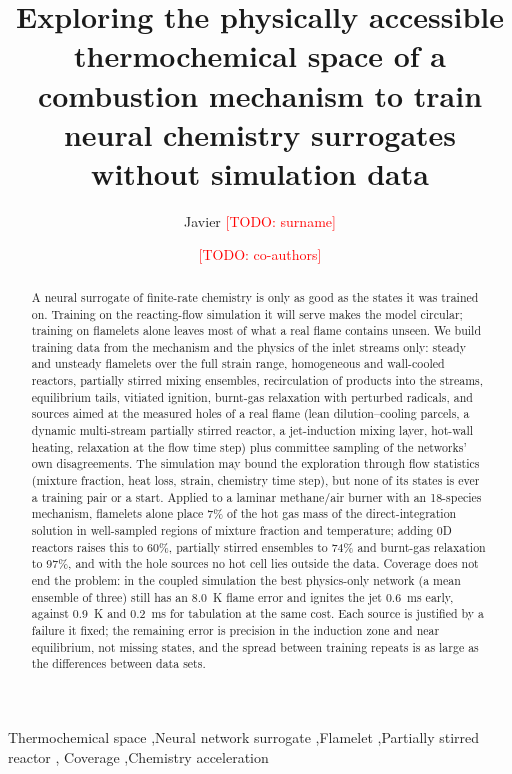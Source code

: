 \documentclass[preprint,review,12pt]{elsarticle}
\newcommand{\todo}[1]{\textcolor{red}{[TODO: #1]}}
\begin{document}
\begin{frontmatter}

\title{Exploring the physically accessible thermochemical space of a combustion mechanism to train neural
chemistry surrogates without simulation data}

\author[a]{Javier \todo{surname}}
\author[a]{\todo{co-authors}}
\address[a]{\todo{affiliation}}

\begin{abstract}
A neural surrogate of finite-rate chemistry is only as good as the states it was trained on. Training on
the reacting-flow simulation it will serve makes the model circular; training on flamelets alone leaves
most of what a real flame contains unseen. We build training data from the mechanism and the physics of the
inlet streams only: steady and unsteady flamelets over the full strain range, homogeneous and wall-cooled
reactors, partially stirred mixing ensembles, recirculation of products into the streams, equilibrium tails,
vitiated ignition, burnt-gas relaxation with perturbed radicals, and sources aimed at the measured holes of a
real flame (lean dilution--cooling parcels, a dynamic multi-stream partially stirred reactor, a jet-induction
mixing layer, hot-wall heating, relaxation at the flow time step) plus committee sampling of the networks'
own disagreements. The simulation may bound the exploration through flow statistics (mixture fraction, heat
loss, strain, chemistry time step), but none of its states is ever a training pair or a start. Applied to a
laminar methane/air burner with an 18-species mechanism, flamelets alone place 7\% of the hot gas mass of the
direct-integration solution in well-sampled regions of mixture fraction and temperature; adding 0D reactors
raises this to 60\%, partially stirred ensembles to 74\% and burnt-gas relaxation to 97\%, and with the hole
sources no hot cell lies outside the data. Coverage does not end the problem: in the coupled simulation the
best physics-only network (a mean ensemble of three) still has an 8.0~K flame error and ignites the jet
0.6~ms early, against 0.9~K and 0.2~ms for tabulation at the same cost. Each source is justified by a failure it
fixed; the remaining error is precision in the induction zone and near equilibrium, not missing states, and the
spread between training repeats is as large as the differences between data sets.
\end{abstract}

\begin{keyword}
Thermochemical space \sep Neural network surrogate \sep Flamelet \sep Partially stirred reactor \sep
Coverage \sep Chemistry acceleration
\end{keyword}
\end{frontmatter}
\end{document}

